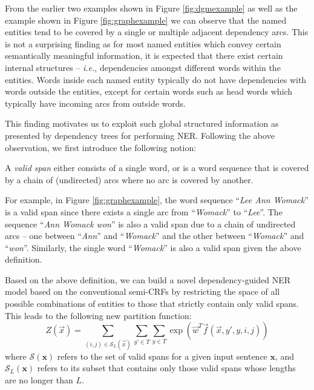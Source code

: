 From the earlier two examples shown in  Figure \ref{fig:dgmexample} as well as the example shown in Figure \ref{fig:graphexample} we can observe that the named entities tend to be covered by a single or multiple adjacent dependency arcs.
This is not a surprising finding as for most named entities which convey certain semantically meaningful information, 
it is expected that there exist certain internal structures -- {\em i.e.}, dependencies amongst different words within the entities.
Words inside each named entity typically do not have dependencies with words outside the entities, except for certain words such as head words which typically have incoming arcs from outside words.

This finding motivates us to exploit such global structured information as presented by dependency trees for performing  NER.
Following the above observation, we first introduce the following notion:
\begin{definition}[Definition 1]
	\label{def:1}
	A {\em valid span} either consists of a single word, or is a word sequence that is covered by a  chain of (undirected) arcs where no arc is covered by another.
\end{definition}

For example, in Figure \ref{fig:graphexample}, the word sequence ``{\em Lee Ann Womack}'' is a valid span since there exists a single arc from ``{\em Womack}'' to ``{\em Lee}''. The sequence ``{\em Ann Womack won}'' is also a valid span due to a chain of undirected arcs -- one between ``{\em Ann}'' and ``{\em Womack}'' and the other between ``{\em Womack}'' and ``{\em won}''.
Similarly, the single word ``{\em Womack}'' is also a valid span given the above definition.

Based on the above definition, we can build a novel dependency-guided NER model based on the conventional semi-CRFs  by restricting the space of all possible combinations of entities to those that strictly contain only valid spans.
This leads to the following new partition function:
\begin{equation}
Z(\vec{x}) = \!\!\!\!\!\!\sum_{(i,j)\in\mathcal{S}_L(\vec{x})}\sum_{y'\in T} \sum_{y\in T}\exp(\vec{w}^{T}\vec{f}(\vec{x}, y', y, {i}, {j}) )
\end{equation}
where $\mathcal{S}(\mathbf{x})$ refers to the set of valid spans for a given input sentence $\mathbf{x}$, and $\mathcal{S}_L(\mathbf{x})$ refers to its subset that contains only those valid spans whose lengths are no longer than $L$.

